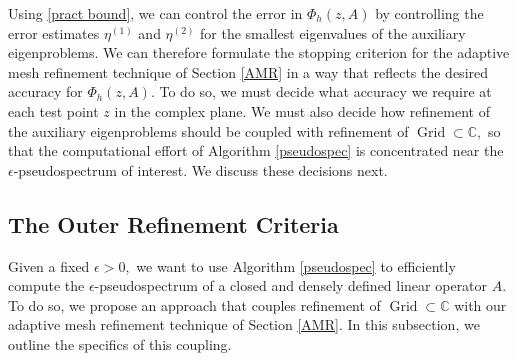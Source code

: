 Using \eqref{pract bound}, we can control the error in $\Phi_h(z, A)$ by controlling the error estimates $\eta^{(1)}$ and $\eta^{(2)}$ for the smallest eigenvalues of the auxiliary eigenproblems. We can therefore formulate the stopping criterion for the adaptive mesh refinement technique of Section \ref{AMR} in a way that reflects the desired accuracy for $\Phi_h(z, A).$ To do so, we must decide what accuracy we require at each test point $z$ in the complex plane. We must also decide how refinement of the auxiliary eigenproblems should be coupled with refinement of $\operatorname{Grid} \subset \mathbb{C},$ so that the computational effort of Algorithm \ref{pseudospec} is concentrated near the $ \epsilon$-pseudospectrum of interest. We discuss these decisions next. 






\subsection{The Outer Refinement Criteria}

Given a fixed $\epsilon > 0,$ we want to use Algorithm \ref{pseudospec} to efficiently compute the $\epsilon$-pseudospectrum of a closed and densely defined linear operator $A.$ To do so, we propose an approach that couples refinement of $\operatorname{Grid} \subset \mathbb{C}$ with our adaptive mesh refinement technique of Section \ref{AMR}. In this subsection, we outline the specifics of this coupling.

